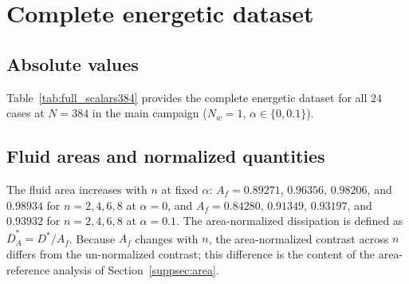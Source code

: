 ﻿\section{Complete energetic dataset}
\label{suppsec:energetics}

\subsection{Absolute values}

Table~\ref{tab:full_scalars384} provides the complete energetic dataset for all $24$ cases at $N=384$ in the main campaign ($N_w=1$, $\alpha\in\{0,0.1\}$).



\subsection{Fluid areas and normalized quantities}

The fluid area increases with $n$ at fixed $\alpha$: $A_f=0.89271$, $0.96356$, $0.98206$, and $0.98934$ for $n=2,4,6,8$ at $\alpha=0$, and $A_f=0.84280$, $0.91349$, $0.93197$, and $0.93932$ for $n=2,4,6,8$ at $\alpha=0.1$. The area-normalized dissipation is defined as $\overline{D}_A^* = D^*/A_f$. Because $A_f$ changes with $n$, the area-normalized contrast across $n$ differs from the un-normalized contrast; this difference is the content of the area-reference analysis of Section~\ref{suppsec:area}.

